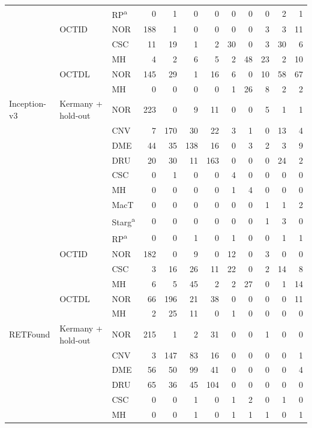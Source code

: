 \begin{tabular}{@{}lll*{9}{r}@{}}
 &  & RP\textsuperscript{a} & 0 & 1 & 0 & 0 & 0 & 0 & 0 & 2 & 1 \\
\addlinespace[1pt]
 & OCTID & NOR & 188 & 1 & 0 & 0 & 0 & 0 & 3 & 3 & 11 \\
 &  & CSC & 11 & 19 & 1 & 2 & 30 & 0 & 3 & 30 & 6 \\
 &  & MH & 4 & 2 & 6 & 5 & 2 & 48 & 23 & 2 & 10 \\
\addlinespace[1pt]
 & OCTDL & NOR & 145 & 29 & 1 & 16 & 6 & 0 & 10 & 58 & 67 \\
 &  & MH & 0 & 0 & 0 & 0 & 1 & 26 & 8 & 2 & 2 \\
\addlinespace[1pt]
\midrule
Inception-v3 & Kermany + hold-out & NOR & 223 & 0 & 9 & 11 & 0 & 0 & 5 & 1 & 1 \\
 &  & CNV & 7 & 170 & 30 & 22 & 3 & 1 & 0 & 13 & 4 \\
 &  & DME & 44 & 35 & 138 & 16 & 0 & 3 & 2 & 3 & 9 \\
 &  & DRU & 20 & 30 & 11 & 163 & 0 & 0 & 0 & 24 & 2 \\
 &  & CSC & 0 & 1 & 0 & 0 & 4 & 0 & 0 & 0 & 0 \\
 &  & MH & 0 & 0 & 0 & 0 & 1 & 4 & 0 & 0 & 0 \\
 &  & MacT & 0 & 0 & 0 & 0 & 0 & 0 & 1 & 1 & 2 \\
 &  & Starg\textsuperscript{a} & 0 & 0 & 0 & 0 & 0 & 0 & 1 & 3 & 0 \\
 &  & RP\textsuperscript{a} & 0 & 0 & 1 & 0 & 1 & 0 & 0 & 1 & 1 \\
\addlinespace[1pt]
 & OCTID & NOR & 182 & 0 & 9 & 0 & 12 & 0 & 3 & 0 & 0 \\
 &  & CSC & 3 & 16 & 26 & 11 & 22 & 0 & 2 & 14 & 8 \\
 &  & MH & 6 & 5 & 45 & 2 & 2 & 27 & 0 & 1 & 14 \\
\addlinespace[1pt]
 & OCTDL & NOR & 66 & 196 & 21 & 38 & 0 & 0 & 0 & 0 & 11 \\
 &  & MH & 2 & 25 & 11 & 0 & 1 & 0 & 0 & 0 & 0 \\
\addlinespace[1pt]
\midrule
RETFound & Kermany + hold-out & NOR & 215 & 1 & 2 & 31 & 0 & 0 & 1 & 0 & 0 \\
 &  & CNV & 3 & 147 & 83 & 16 & 0 & 0 & 0 & 0 & 1 \\
 &  & DME & 56 & 50 & 99 & 41 & 0 & 0 & 0 & 0 & 4 \\
 &  & DRU & 65 & 36 & 45 & 104 & 0 & 0 & 0 & 0 & 0 \\
 &  & CSC & 0 & 0 & 1 & 0 & 1 & 2 & 0 & 1 & 0 \\
 &  & MH & 0 & 0 & 1 & 0 & 1 & 1 & 1 & 0 & 1 \\

\end{tabular}
